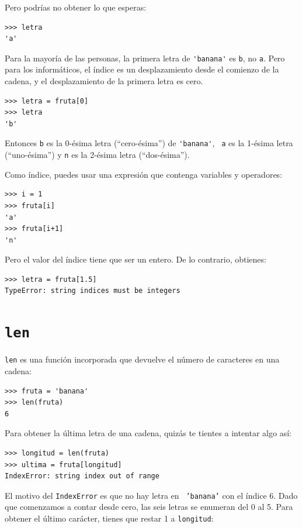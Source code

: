 \documentclass[10pt]{book}
\begin{document}
Pero podrías no obtener lo que esperas:

\begin{verbatim}
>>> letra
'a'
\end{verbatim}
%
Para la mayoría de las personas, la primera letra de \verb"'banana'" es {\tt b}, no
{\tt a}.  Pero para los informáticos, el índice es un desplazamiento desde el
comienzo de la cadena, y el desplazamiento de la primera letra es cero.

\begin{verbatim}
>>> letra = fruta[0]
>>> letra
'b'
\end{verbatim}
%
Entonces {\tt b} es la 0-ésima letra  (``cero-ésima'') de \verb"'banana'", {\tt
  a} es la 1-ésima letra (``uno-ésima'') y {\tt n} es la 2-ésima letra
(``dos-ésima'').   

Como índice, puedes usar una expresión que contenga variables y
operadores:

\begin{verbatim}
>>> i = 1
>>> fruta[i]
'a'
>>> fruta[i+1]
'n'
\end{verbatim}
%

Pero el valor del índice tiene que ser un entero.  De lo contrario,
obtienes:

\begin{verbatim}
>>> letra = fruta[1.5]
TypeError: string indices must be integers
\end{verbatim}
%

\section{{\tt len}}

{\tt len} es una función incorporada que devuelve el número de caracteres
en una cadena:

\begin{verbatim}
>>> fruta = 'banana'
>>> len(fruta)
6
\end{verbatim}
%
Para obtener la última letra de una cadena, quizás te tientes a intentar algo
así:

\begin{verbatim}
>>> longitud = len(fruta)
>>> ultima = fruta[longitud]
IndexError: string index out of range
\end{verbatim}
%
El motivo del {\tt IndexError} es que no hay letra en {\tt
'banana'} con el índice 6.  Dado que comenzamos a contar desde cero, las
seis letras se enumeran del 0 al 5.  Para obtener el último carácter, tienes
que restar 1 a {\tt longitud}:
\end{document}
